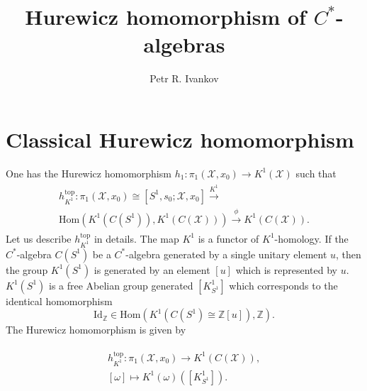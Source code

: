 \documentclass{beamer}
\title{Hurewicz homomorphism of $C^*$-algebras}
\institute
{
 Algebras in analisys
}
\author{Petr R. Ivankov  }
\theoremstyle{plain}
\newcommand{\Z}{\mathbb{Z}}                  %
\newcommand{\om}{\omega}                     %
\newcommand{\Id}{\mathrm{Id}}
\newcommand{\Hom}{\mathrm{Hom}}
\newcommand{\sX}{\mathcal{X}}       %
\newcommand{\bean}{\begin{eqnarray*}}
\newcommand{\eean}{\end{eqnarray*}}
\begin{document}
\begin{frame}
  \titlepage
\end{frame}
\section{Classical Hurewicz homomorphism}
\begin{frame}
	One has the  \alert{Hurewicz homomorphism} 	$h_1:\pi_1\left(\sX, x_0 \right)\to K^1\left(\sX \right)$ such that
	\bean
	\begin{split}
		h^{\mathrm{top}}_{K^1}	:\pi_1\left(\sX, x_0 \right)\cong \left[S^1, s_0; \sX, x_0\right]\xrightarrow{K^1}\\ \Hom\left(K^1\left(C\left( S^1\right)  \right), K^1\left(C\left( \sX \right) \right)\right) \xrightarrow {\phi} K^1\left(C\left( \sX \right) \right).
	\end{split}
	\eean
	Let us describe $h^{\mathrm{top}}_{K^1}$ in details. The map $K^1$ is a functor of $K^1$-homology. 
	If the $C^*$-algebra  $C\left( S^1\right)$ be a $C^*$-algebra generated by a single unitary element $u$, then the group $K^1\left( S^1\right)$  is generated by an element $\left[u\right]$ which is represented by $u$.  $K^1\left( S^1\right)$ is a free Abelian group generated  $\left[ 	K^1_{S^1}\right]$ which corresponds to the identical homomorphism $$\Id_\Z \in \Hom\left( K^1\left(C\left( S^1\right) \cong \Z \left[u\right] \right), \Z \right).$$  
	The Hurewicz homomorphism is given by
	
	\bean
	\begin{split}
		h^{\mathrm{top}}_{K^1}	:\pi_1\left(\sX, x_0 \right)\to K^1\left(C\left( \sX \right) \right),\\
		\left[\om \right] \mapsto K^1\left( \om \right) \left( \left[ 	K^1_{S^1}\right]\right) .
	\end{split}
	\eean
	
	
\end{frame}
\end{document}

